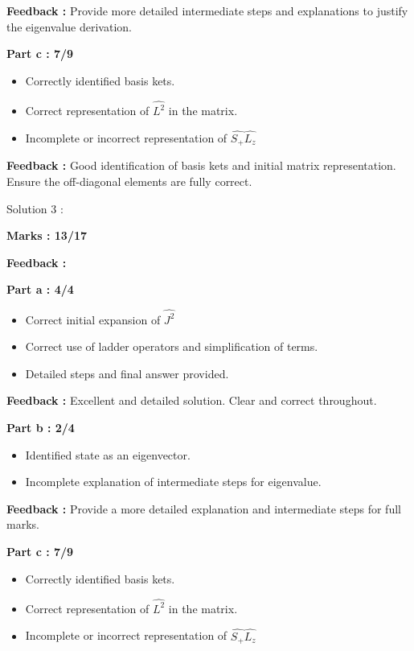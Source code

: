 \documentclass[a4paper,11pt]{article}
\begin{document}
\textbf{Feedback :}
Provide more detailed intermediate steps and explanations to justify the eigenvalue derivation.


\textbf{Part c : 7/9}

\begin{itemize}
    \item Correctly identified basis kets.
    \item Correct representation of $\hat{L^2}$ in the matrix.
    \item Incomplete or incorrect representation of $\hat{S_+}\hat{L_z}$
\end{itemize}

\textbf{Feedback :}
Good identification of basis kets and initial matrix representation. Ensure the off-diagonal elements are fully correct.



Solution 3 :

\textbf{Marks : 13/17}

\textbf{Feedback : }

\textbf{Part a : 4/4}

\begin{itemize}
    \item Correct initial expansion of $\hat{J^2}$
    \item Correct use of ladder operators and simplification of terms.
    \item Detailed steps and final answer provided.
\end{itemize}

\textbf{Feedback :}
Excellent and detailed solution. Clear and correct throughout.


\textbf{Part b : 2/4}

\begin{itemize}
    \item Identified state as an eigenvector.
    \item Incomplete explanation of intermediate steps for eigenvalue.
\end{itemize}

\textbf{Feedback :}
Provide a more detailed explanation and intermediate steps for full marks.


\textbf{Part c : 7/9}

\begin{itemize}
    \item Correctly identified basis kets.
    \item Correct representation of $\hat{L^2}$ in the matrix.
    \item Incomplete or incorrect representation of $\hat{S_+}\hat{L_z}$
\end{itemize}
\end{document}
